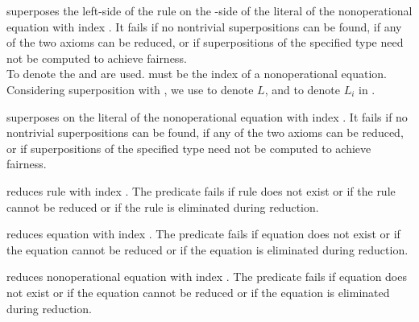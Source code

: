 \begin{command}
superposes the left-side of the rule  on the 
-side of the
literal  of the nonoperational equation with index 
.
It fails if no nontrivial superpositions can be found, if
any of the two axioms can be reduced, or if
superpositions of the specified type need not be computed to achieve 
fairness.\\
To denote the   and  are used. 
 must be the index of a nonoperational equation.
Considering superposition with
, 
we use  to denote $L$, and 
to denote $L_i$ in .
\end{command}

\begin{command}
superposes  on the literal  of the 
nonoperational equation with index .
It fails if no nontrivial superpositions can be found, if
any of the two axioms can be reduced, or if
superpositions of the specified type need not be computed to achieve 
fairness.
\end{command}

\begin{command}
reduces rule with index . The predicate fails if rule 
 does not
exist or if the rule cannot be reduced or if the rule is eliminated during 
reduction.
\end{command}

\begin{command}
reduces equation with index . 
The predicate fails if equation  does
not exist or if the equation cannot be reduced or if the equation is eliminated
during reduction.
\end{command}
 
\begin{command}
reduces nonoperational equation with index . 
The predicate fails if equation
 does not exist or if the equation cannot be reduced or if the 
equation is eliminated during reduction.
\end{command}

